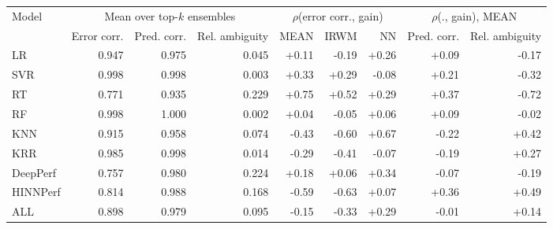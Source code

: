 \begin{tabular}{lrrrrrrrr}
\toprule
Model & \multicolumn{3}{c}{Mean over top-$k$ ensembles} & \multicolumn{3}{c}{$\rho$(error corr., gain)} & \multicolumn{2}{c}{$\rho$(., gain), MEAN} \\
 & Error corr. & Pred. corr. & Rel. ambiguity & MEAN & IRWM & NN & Pred. corr. & Rel. ambiguity \\
\midrule
LR & 0.947 & 0.975 & 0.045 & +0.11 & -0.19 & +0.26 & +0.09 & -0.17 \\
SVR & 0.998 & 0.998 & 0.003 & +0.33 & +0.29 & -0.08 & +0.21 & -0.32 \\
RT & 0.771 & 0.935 & 0.229 & +0.75 & +0.52 & +0.29 & +0.37 & -0.72 \\
RF & 0.998 & 1.000 & 0.002 & +0.04 & -0.05 & +0.06 & +0.09 & -0.02 \\
KNN & 0.915 & 0.958 & 0.074 & -0.43 & -0.60 & +0.67 & -0.22 & +0.42 \\
KRR & 0.985 & 0.998 & 0.014 & -0.29 & -0.41 & -0.07 & -0.19 & +0.27 \\
DeepPerf & 0.757 & 0.980 & 0.224 & +0.18 & +0.06 & +0.34 & -0.07 & -0.19 \\
HINNPerf & 0.814 & 0.988 & 0.168 & -0.59 & -0.63 & +0.07 & +0.36 & +0.49 \\
ALL & 0.898 & 0.979 & 0.095 & -0.15 & -0.33 & +0.29 & -0.01 & +0.14 \\
\bottomrule
\end{tabular}
